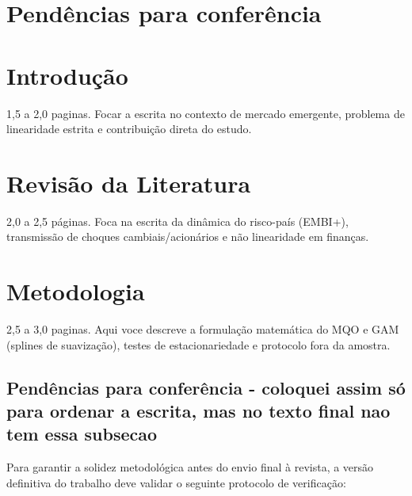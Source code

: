 \documentclass[11pt,a4paper]{article}
\begin{document}

\section{Pendências para conferência}




\section{Introdução}

1,5 a 2,0 paginas. Focar a escrita no contexto de mercado emergente, problema de linearidade estrita e contribuição direta do estudo.


\section{Revisão da Literatura}

2,0 a 2,5 páginas. Foca na escrita da dinâmica do risco-país (EMBI+), transmissão de choques cambiais/acionários e não linearidade em finanças.



\section{Metodologia}

2,5 a 3,0 paginas. Aqui voce descreve a formulação matemática do MQO e GAM (splines de suavização), testes de estacionariedade e protocolo fora da amostra.


\subsection{Pendências para conferência - coloquei assim só para ordenar a escrita, mas no texto final nao tem essa subsecao}

Para garantir a solidez metodológica antes do envio final à revista, a versão definitiva do trabalho deve validar o seguinte protocolo de verificação:
\end{document}
